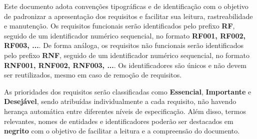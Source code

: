 

Este documento adota convenções tipográficas e de identificação com o objetivo de padronizar a apresentação dos requisitos e facilitar sua leitura, rastreabilidade e manutenção. Os requisitos funcionais serão identificados pelo prefixo \textbf{RF}, seguido de um identificador numérico sequencial, no formato \textbf{RF001, RF002, RF003, ...}. De forma análoga, os requisitos não funcionais serão identificados pelo prefixo \textbf{RNF}, seguido de um identificador numérico sequencial, no formato \textbf{RNF001, RNF002, RNF003, ...}. Os identificadores são únicos e não devem ser reutilizados, mesmo em caso de remoção de requisitos.

As prioridades dos requisitos serão classificadas como \textbf{Essencial}, \textbf{Importante} e \textbf{Desejável}, sendo atribuídas individualmente a cada requisito, não havendo herança automática entre diferentes níveis de especificação. Além disso, termos relevantes, nomes de entidades e identificadores poderão ser destacados em \textbf{negrito} com o objetivo de facilitar a leitura e a compreensão do documento.